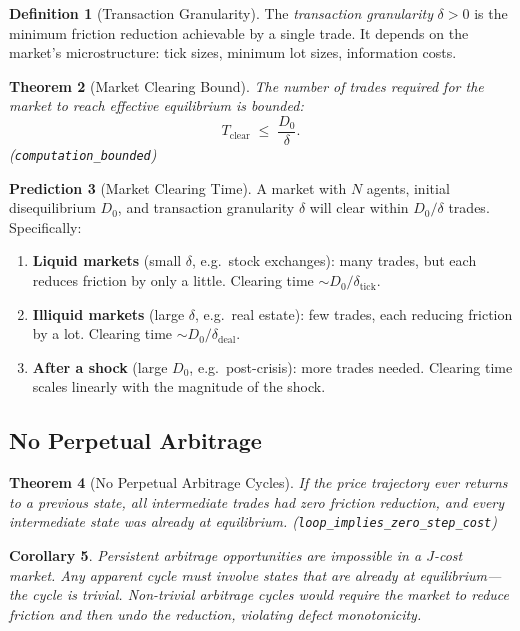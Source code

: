 \documentclass[11pt,a4paper]{article}
\theoremstyle{plain}
\newtheorem{theorem}{Theorem}[section]
\newtheorem{corollary}[theorem]{Corollary}
\theoremstyle{definition}
\newtheorem{definition}[theorem]{Definition}
\newtheorem{prediction}[theorem]{Prediction}
\theoremstyle{remark}
\newcommand{\Jcost}{J}
\begin{document}
\begin{definition}[Transaction Granularity]\label{def:granularity}
The \emph{transaction granularity} $\delta > 0$ is the minimum friction reduction achievable by a single trade.
It depends on the market's microstructure: tick sizes, minimum lot sizes, information costs.
\end{definition}

\begin{theorem}[Market Clearing Bound]\label{thm:clearing}
The number of trades required for the market to reach effective equilibrium is bounded:
\[
T_{\text{clear}} \;\le\; \frac{D_0}{\delta}.
\]
\emph{(\texttt{computation\_bounded})}
\end{theorem}

\begin{prediction}[Market Clearing Time]\label{pred:clearing}
A market with $N$ agents, initial disequilibrium $D_0$, and transaction granularity $\delta$ will clear within $D_0/\delta$ trades.
Specifically:
\begin{enumerate}[nosep]
\item \textbf{Liquid markets} (small $\delta$, e.g.\ stock exchanges): many trades, but each reduces friction by only a little. Clearing time $\sim D_0/\delta_{\text{tick}}$.
\item \textbf{Illiquid markets} (large $\delta$, e.g.\ real estate): few trades, each reducing friction by a lot. Clearing time $\sim D_0/\delta_{\text{deal}}$.
\item \textbf{After a shock} (large $D_0$, e.g.\ post-crisis): more trades needed. Clearing time scales linearly with the magnitude of the shock.
\end{enumerate}
\end{prediction}

\subsection{No Perpetual Arbitrage}

\begin{theorem}[No Perpetual Arbitrage Cycles]\label{thm:noarb}
If the price trajectory ever returns to a previous state, all intermediate trades had zero friction reduction, and every intermediate state was already at equilibrium.
\emph{(\texttt{loop\_implies\_zero\_step\_cost})}
\end{theorem}

\begin{corollary}
Persistent arbitrage opportunities are impossible in a $\Jcost$-cost market.
Any apparent cycle must involve states that are already at equilibrium---the cycle is trivial.
Non-trivial arbitrage cycles would require the market to reduce friction and then undo the reduction, violating defect monotonicity.
\end{corollary}
\end{document}
